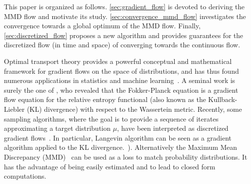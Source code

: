 This paper is organized as follows.  \cref{sec:gradient_flow} is devoted to deriving the MMD flow and motivate its study.
\cref{sec:convergence_mmd_flow} investigates the convergence towards a global optimum of the MMD flow. Finally, \cref{sec:discretized_flow} proposes a new algorithm and provides guarantees for the discretized flow (in time and space) of converging towards the continuous flow. 




\fi




Optimal transport theory provides a powerful conceptual and mathematical framework for gradient flows on the space of distributions, and has thus found numerous applications in statistics and machine learning~\cite{cuturi,ambrosio2008gradient}. A seminal work is surely the one of \cite{jordan1998variational}, who revealed that the Fokker-Planck equation is a gradient
flow equation for the relative entropy functional (also known as the Kullback-Liebler (KL) divergence) with respect to the Wassertein metric. Recently, some sampling algorithms, where the goal is to provide a sequence of iterates approximating a target distribution $\mu$, have been interpreted as discretized gradient flows~\cite{liu2017stein, csimcsekli2018sliced, bernton2018langevin, mroueh2018regularized,durmus2018analysis,wibisono2018sampling}. In particular, Langevin algorithm can be seen as a gradient algorithm applied to the KL divergence.~\cite{bernton2018langevin,wibisono2018sampling,durmus2018analysis}). %
Alternatively the Maximum Mean Discrepancy (MMD)~\cite{gretton2012kernel} can be used as a loss to match probability distributions. It has the advantage of being easily estimated and to lead to closed form computations.


